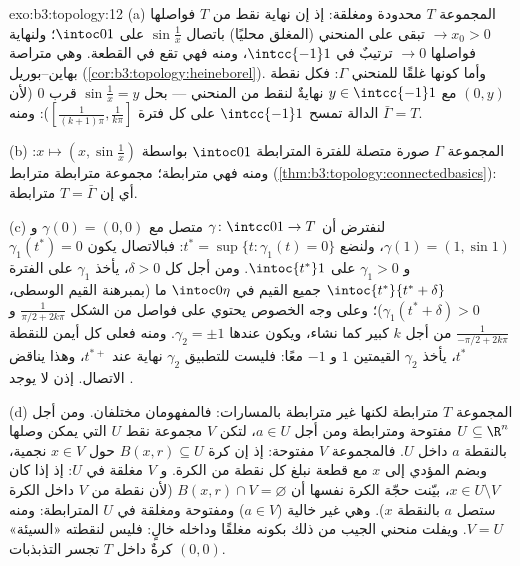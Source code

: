 \begin{solution}{exo:b3:topology:12}
(a) المجموعة $T$ محدودة ومغلقة: إذ إن نهاية نقط من $T$ فواصلها
$\to x_0 > 0$ تبقى على المنحني (المغلق محليًا) باتصال
$\sin\frac1x$ على $\intoc01$؛ ولنهاية فواصلها $\to 0$ ترتيبٌ في
$\intcc{-1}1$، ومنه فهي تقع في القطعة. وهي متراصة
بهاين--بوريل (\cref{cor:b3:topology:heineborel}). وأما كونها غلقًا للمنحني $\Gamma$:
فكل نقطة $(0, y)$ مع $y \in \intcc{-1}1$ نهايةٌ لنقط من المنحني --- بحل
$\sin\frac1x = y$ قرب $0$ (لأن الدالة تمسح $\intcc{-1}1$ على كل فترة
$[\frac1{(k+1)\pi}, \frac1{k\pi}]$): ومنه $\bar\Gamma = T$.

(b) المجموعة $\Gamma$ صورة متصلة للفترة المترابطة $\intoc01$
بواسطة $x \mapsto (x, \sin\frac1x)$: ومنه فهي مترابطة؛  مجموعة مترابطة مترابط
(\cref{thm:b3:topology:connectedbasics}): أي إن $T = \bar\Gamma$ مترابطة.

(c) لنفترض أن $\gamma\colon\intcc01\to T$ متصل مع $\gamma(0) = (0,0)$ و $\gamma(1) = (1, \sin1)$، ولنضع $t^*
= \sup\{t : \gamma_1(t) = 0\}$:
فبالاتصال يكون $\gamma_1(t^*)
= 0$ و $\gamma_1 > 0$ على $\intoc{t^*}1$. ومن
أجل كل $\delta > 0$، يأخذ $\gamma_1$ على الفترة $\intoc{t^*}{t^*+\delta}$ جميع
القيم في $\intoc0\eta$ ما (بمبرهنة القيم الوسطى، $\gamma_1(t^* + \delta) > 0$)؛ وعلى
وجه الخصوص يحتوي على فواصل من الشكل $\frac1{\pi/2 + 2k\pi}$ و $\frac1{-\pi/2 + 2k\pi}$ من أجل
$k$ كبير كما نشاء، ويكون عندها $\gamma_2 = \pm1$. ومنه فعلى كل  أيمن
للنقطة $t^*$، يأخذ $\gamma_2$ القيمتين $1$ و $-1$ معًا: فليست
للتطبيق $\gamma_2$ نهاية عند $t^{*+}$، وهذا يناقض الاتصال. إذن لا
يوجد .

(d) المجموعة $T$ مترابطة لكنها غير مترابطة بالمسارات:
فالمفهومان مختلفان. ومن أجل $U \subseteq \R^n$ مفتوحة ومترابطة ومن أجل
$a \in U$، لتكن $V$ مجموعة نقط $U$ التي يمكن وصلها بالنقطة $a$
 داخل $U$. فالمجموعة $V$ مفتوحة: إذ إن كرة $B(x, r)
\subseteq U$ حول
$x \in V$ نجمية، وبضم  المؤدي إلى $x$ مع قطعة نبلغ كل
نقطة من الكرة. و $V$ مغلقة في $U$: إذ إذا كان $x \in U \setminus V$، بيّنت
حجّة الكرة نفسها أن $B(x, r) \cap V = \varnothing$ (لأن نقطة من $V$ داخل الكرة ستصل
$a$ بالنقطة $x$). وهي غير خالية ($a \in
V$) ومفتوحة ومغلقة في $U$
المترابطة: ومنه $V = U$. ويفلت منحني الجيب من ذلك بكونه مغلقًا
وداخله خالٍ: فليس لنقطته «السيئة» $(0,0)$ كرةٌ داخل $T$ تجسر
التذبذبات.
\end{solution}


